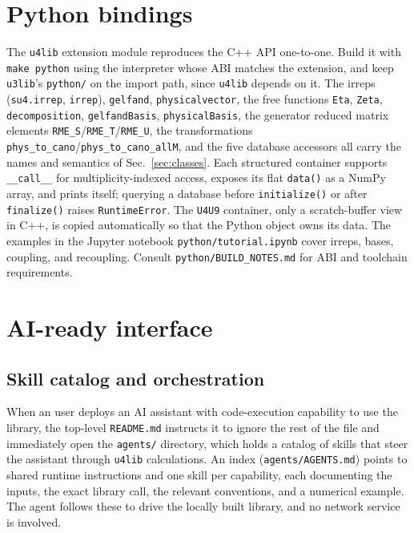 \documentclass[aps,onecolumn,10pt,superscriptaddress,floatfix,nofootinbib]{revtex4}
\begin{document}
\section{Python bindings}
\label{sec:python}

The \verb|u4lib| extension module reproduces the C++ API one-to-one. Build it
with \verb|make python| using the interpreter whose ABI matches the extension,
and keep \texttt{u3lib}'s \verb|python/| on the import path, since \verb|u4lib|
depends on it. The irreps (\verb|su4.irrep|, \verb|irrep|), \verb|gelfand|,
\verb|physicalvector|, the free functions \verb|Eta|, \verb|Zeta|,
\verb|decomposition|, \verb|gelfandBasis|, \verb|physicalBasis|, the generator
reduced matrix elements \verb|RME_S|/\verb|RME_T|/\verb|RME_U|, the transformations
\verb|phys_to_cano|/\verb|phys_to_cano_allM|, and the five database accessors all
carry the names and semantics of Sec.~\ref{sec:classes}. Each structured
container supports \verb|__call__| for multiplicity-indexed access, exposes its
flat \verb|data()| as a NumPy array, and prints itself; querying a database
before \verb|initialize()| or after \verb|finalize()| raises \verb|RuntimeError|. 
The \verb|U4U9| container, only a scratch-buffer view in
C++, is copied automatically so that the Python object owns its data.
The examples in the Jupyter notebook \verb|python/tutorial.ipynb| cover irreps, bases, coupling, and recoupling.
Consult \verb|python/BUILD_NOTES.md| for ABI and toolchain requirements.

\section{AI-ready interface}
\label{sec:agents}

\subsection{Skill catalog and orchestration}

When an user deploys an AI assistant with code-execution capability to use the library,
the top-level \texttt{README.md} instructs it to ignore the rest of the file and immediately
open the \verb|agents/| directory, which holds a catalog of skills that steer the
assistant through \texttt{u4lib} calculations. An index (\verb|agents/AGENTS.md|)
points to shared runtime instructions and one skill per capability, each documenting
the inputs, the exact library call, the relevant conventions, and a numerical
example. The agent follows these to drive the locally built library, and no network service is involved.
\end{document}
